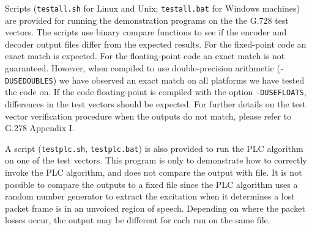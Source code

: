 Scripts ({\tt testall.sh} for Linux and Unix; {\tt testall.bat} for
Windows machines)
are provided for running the demonstration programs on the the G.728 test vectors. The scripts use binary compare functions to see if
the encoder and decoder output files differ
from the expected results.
For the fixed-point code an exact match is expected.
For the floating-point code an exact match is not guaranteed.
However, when compiled to use double-precision
arithmetic ({\tt -DUSEDOUBLES}) we have observed an exact match on
all platforms we have tested the code on.
If the code floating-point is compiled with the option {\tt -DUSEFLOATS},
differences in the test vectors should be expected.
For further details on the test vector verification
procedure when the outputs do not match, please refer to G.278
Appendix I.

A script ({\tt testplc.sh}, {\tt testplc.bat}) is also provided to run
the PLC algorithm on one of the test vectors. This program is only
to demonstrate how to correctly invoke the PLC algorithm, and does
not compare the output with file. It is not possible to compare the 
outputs to a fixed file since the PLC algorithm uses a
random number generator to extract the excitation when it determines
a lost packet frame is in an unvoiced region of speech.
Depending on where the packet losses occur, the output
may be different for each run on the same file.  
